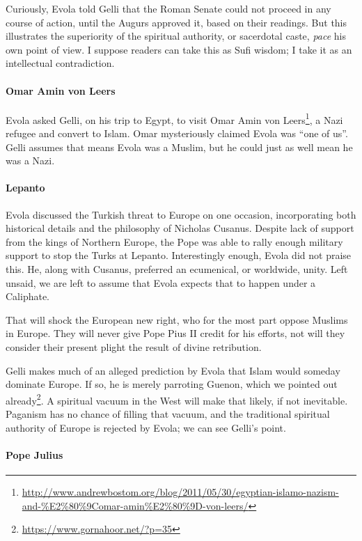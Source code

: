 Curiously, Evola told Gelli that the Roman Senate could not proceed in any course of action, until the Augurs approved it, based on their readings. But this illustrates the superiority of the spiritual authority, or sacerdotal caste, \emph{pace} his own point of view. I suppose readers can take this as Sufi wisdom; I take it as an intellectual contradiction.

\paragraph{Omar Amin von Leers}


Evola asked Gelli, on his trip to Egypt, to visit Omar Amin von Leers\footnote{\url{http://www.andrewbostom.org/blog/2011/05/30/egyptian-islamo-nazism-and-\%E2\%80\%9Comar-amin\%E2\%80\%9D-von-leers/}}, a Nazi refugee and convert to Islam. Omar mysteriously claimed Evola was ``one of us''. Gelli assumes that means Evola was a Muslim, but he could just as well mean he was a Nazi.

\paragraph{Lepanto}


Evola discussed the Turkish threat to Europe on one occasion, incorporating both historical details and the philosophy of Nicholas Cusanus. Despite lack of support from the kings of Northern Europe, the Pope was able to rally enough military support to stop the Turks at Lepanto. Interestingly enough, Evola did not praise this. He, along with Cusanus, preferred an ecumenical, or worldwide, unity. Left unsaid, we are left to assume that Evola expects that to happen under a Caliphate.

That will shock the European new right, who for the most part oppose Muslims in Europe. They will never give Pope Pius II credit for his efforts, not will they consider their present plight the result of divine retribution.

Gelli makes much of an alleged prediction by Evola that Islam would someday dominate Europe. If so, he is merely parroting Guenon, which we pointed out already\footnote{\url{https://www.gornahoor.net/?p=35}}. A spiritual vacuum in the West will make that likely, if not inevitable. Paganism has no chance of filling that vacuum, and the traditional spiritual authority of Europe is rejected by Evola; we can see Gelli's point.

\paragraph{Pope Julius}


